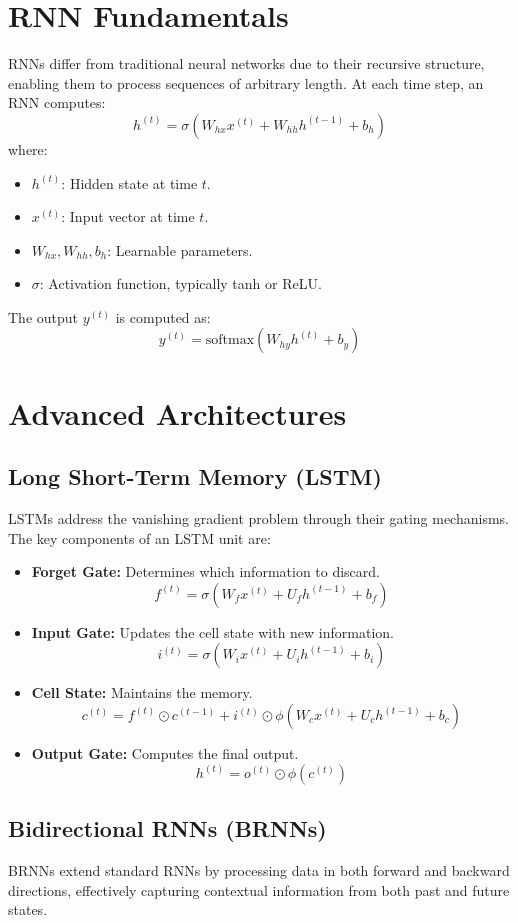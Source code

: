 \section{RNN Fundamentals}
RNNs differ from traditional neural networks due to their recursive structure, enabling them to process sequences of arbitrary length. At each time step, an RNN computes:
\[
h^{(t)} = \sigma(W_{hx}x^{(t)} + W_{hh}h^{(t-1)} + b_h)
\]
where:
\begin{itemize}
    \item \( h^{(t)} \): Hidden state at time \( t \).
    \item \( x^{(t)} \): Input vector at time \( t \).
    \item \( W_{hx}, W_{hh}, b_h \): Learnable parameters.
    \item \( \sigma \): Activation function, typically tanh or ReLU.
\end{itemize}

The output \( y^{(t)} \) is computed as:
\[
y^{(t)} = \text{softmax}(W_{hy} h^{(t)} + b_y)
\]

\section{Advanced Architectures}
\subsection{Long Short-Term Memory (LSTM)}
LSTMs address the vanishing gradient problem through their gating mechanisms. The key components of an LSTM unit are:
\begin{itemize}
    \item \textbf{Forget Gate:} Determines which information to discard.
    \[
    f^{(t)} = \sigma(W_f x^{(t)} + U_f h^{(t-1)} + b_f)
    \]
    \item \textbf{Input Gate:} Updates the cell state with new information.
    \[
    i^{(t)} = \sigma(W_i x^{(t)} + U_i h^{(t-1)} + b_i)
    \]
    \item \textbf{Cell State:} Maintains the memory.
    \[
    c^{(t)} = f^{(t)} \odot c^{(t-1)} + i^{(t)} \odot \phi(W_c x^{(t)} + U_c h^{(t-1)} + b_c)
    \]
    \item \textbf{Output Gate:} Computes the final output.
    \[
    h^{(t)} = o^{(t)} \odot \phi(c^{(t)})
    \]
\end{itemize}

\subsection{Bidirectional RNNs (BRNNs)}
BRNNs extend standard RNNs by processing data in both forward and backward directions, effectively capturing contextual information from both past and future states.

